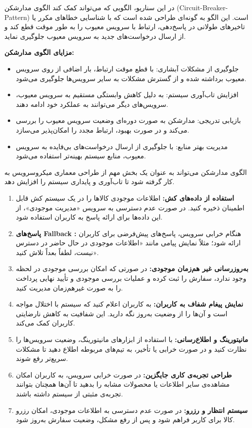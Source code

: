 



	در این سناریو، الگویی که می‌تواند کمک کند الگوی مدارشکن (Circuit-Breaker-Pattern) است. این الگو به گونه‌ای طراحی شده است که با شناسایی خطاهای مکرر یا تاخیرهای طولانی در پاسخ‌دهی، ارتباط با سرویس معیوب را به طور موقت قطع کند و از ارسال درخواست‌های جدید به سرویس معیوب جلوگیری نماید.
	
	\textbf{مزایای الگوی مدارشکن:}
	\begin{itemize}
		\item جلوگیری از مشکلات آبشاری: با قطع موقت ارتباط، بار اضافی از روی سرویس معیوب برداشته شده و از گسترش مشکلات به سایر سرویس‌ها جلوگیری می‌شود.
		\item افزایش تاب‌آوری سیستم: به دلیل کاهش وابستگی مستقیم به سرویس معیوب، سرویس‌های دیگر می‌توانند به عملکرد خود ادامه دهند.
		\item بازیابی تدریجی: مدارشکن به صورت دوره‌ای وضعیت سرویس معیوب را بررسی می‌کند و در صورت بهبود، ارتباط مجدد را امکان‌پذیر می‌سازد.
		\item مدیریت بهتر منابع: با جلوگیری از ارسال درخواست‌های بی‌فایده به سرویس معیوب، منابع سیستم بهینه‌تر استفاده می‌شود.
	\end{itemize}
	
	الگوی مدارشکن می‌تواند به عنوان یک بخش مهم از طراحی معماری میکروسرویس به کار گرفته شود تا تاب‌آوری و پایداری سیستم را افزایش دهد.




	\begin{enumerate}
		\item \textbf{استفاده از داده‌های کش:} اطلاعات موجودی کالاها را در یک سیستم کش قابل اطمینان ذخیره کنید. در صورت عدم دسترسی به سرویس «مدیریت موجودی»، از این داده‌ها برای ارائه پاسخ به کاربران استفاده شود.
		\item \textbf{پاسخ‌های Fallback :} هنگام خرابی سرویس، پاسخ‌های پیش‌فرضی برای کاربران ارائه شود؛ مثلاً نمایش پیامی مانند «اطلاعات موجودی در حال حاضر در دسترس نیست، لطفاً بعداً تلاش کنید».
		\item \textbf{به‌روزرسانی غیر هم‌زمان موجودی:} در صورتی که امکان بررسی موجودی در لحظه وجود ندارد، سفارش را ثبت کرده و عملیات بررسی موجودی و تأیید نهایی پرداخت را به صورت غیرهم‌زمان مدیریت کنید.
		\item \textbf{نمایش پیغام شفاف به کاربران:} به کاربران اعلام کنید که سیستم با اختلال مواجه است و آن‌ها را از وضعیت به‌روز نگه دارید. این شفافیت به کاهش نارضایتی کاربران کمک می‌کند.
		\item \textbf{مانیتورینگ و اطلاع‌رسانی:} با استفاده از ابزارهای مانیتورینگ، وضعیت سرویس‌ها را نظارت کنید و در صورت خرابی یا تأخیر، به تیم‌های مربوطه اطلاع دهید تا مشکلات سریع‌تر رفع شوند.
		\item \textbf{طراحی تجربه‌ی کاری جایگزین:} در صورت خرابی سرویس، به کاربران امکان مشاهده‌ی سایر اطلاعات یا محصولات مشابه را بدهید تا آن‌ها همچنان بتوانند تجربه‌ی مثبتی از سیستم داشته باشند.
		\item \textbf{سیستم انتظار و رزرو:} در صورت عدم دسترسی به اطلاعات موجودی، امکان رزرو کالا برای کاربر فراهم شود و پس از رفع مشکل، وضعیت سفارش به‌روز شود.
	\end{enumerate}
	
